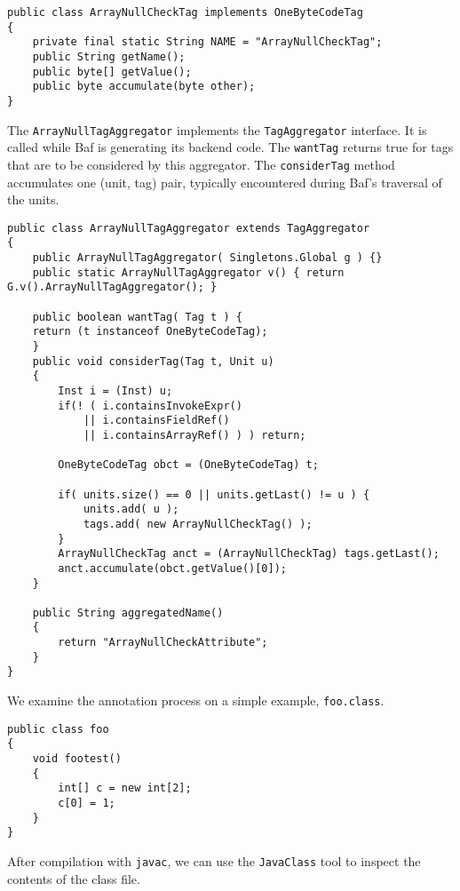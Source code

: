 \documentclass{article}
\begin{document}
\begin{verbatim}
public class ArrayNullCheckTag implements OneByteCodeTag
{
    private final static String NAME = "ArrayNullCheckTag";
    public String getName();
    public byte[] getValue();
    public byte accumulate(byte other);
}
\end{verbatim}

The {\tt ArrayNullTagAggregator} implements the {\tt TagAggregator}
interface.  It is called while Baf is generating its backend code.
The {\tt wantTag} returns true for tags that are to be considered
by this aggregator.
The {\tt considerTag}
method accumulates one (unit, tag) pair, typically encountered
during Baf's traversal of the units.

\begin{verbatim}
public class ArrayNullTagAggregator extends TagAggregator
{    
    public ArrayNullTagAggregator( Singletons.Global g ) {}
    public static ArrayNullTagAggregator v() { return G.v().ArrayNullTagAggregator(); }

    public boolean wantTag( Tag t ) {
	return (t instanceof OneByteCodeTag);
    }
    public void considerTag(Tag t, Unit u)
    {
        Inst i = (Inst) u;
        if(! ( i.containsInvokeExpr()
            || i.containsFieldRef()
            || i.containsArrayRef() ) ) return;

        OneByteCodeTag obct = (OneByteCodeTag) t;

        if( units.size() == 0 || units.getLast() != u ) {
            units.add( u );
            tags.add( new ArrayNullCheckTag() );
        }
        ArrayNullCheckTag anct = (ArrayNullCheckTag) tags.getLast();
        anct.accumulate(obct.getValue()[0]);
    }
    
    public String aggregatedName()
    {
        return "ArrayNullCheckAttribute"; 
    }
}
\end{verbatim}

We examine the annotation process on a simple example, {\tt foo.class}.

\begin{verbatim}
public class foo
{    
    void footest()
    {        
        int[] c = new int[2];
        c[0] = 1;
    }
}
\end{verbatim}

After compilation with {\tt javac}, we can use the {\tt JavaClass}
tool to inspect the contents of the class file.
\end{document}
